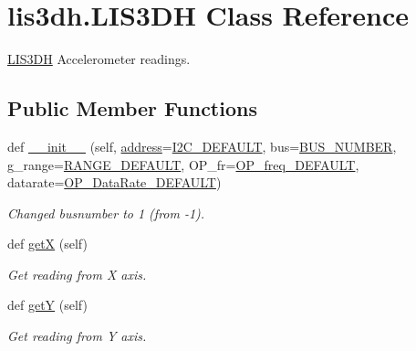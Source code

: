 \hypertarget{classlis3dh_1_1_l_i_s3_d_h}{}\section{lis3dh.\+L\+I\+S3\+DH Class Reference}
\label{classlis3dh_1_1_l_i_s3_d_h}


\mbox{\hyperlink{classlis3dh_1_1_l_i_s3_d_h}{L\+I\+S3\+DH}} Accelerometer readings.  


\subsection*{Public Member Functions}
\begin{DoxyCompactItemize}
\item 
def \mbox{\hyperlink{classlis3dh_1_1_l_i_s3_d_h_a9097ea52b7af8361987dee7b6ab1d3f1}{\+\_\+\+\_\+init\+\_\+\+\_\+}} (self, \mbox{\hyperlink{classlis3dh_1_1_l_i_s3_d_h_a0cd329009ec1fbf55f4789f59181cf04}{address}}=\mbox{\hyperlink{classlis3dh_1_1_l_i_s3_d_h_af6b66a20ed2112e95c14ce7b58697d9f}{I2\+C\+\_\+\+D\+E\+F\+A\+U\+LT}}, bus=\mbox{\hyperlink{classlis3dh_1_1_l_i_s3_d_h_a6dd4e8c65978e98d0f3765ff58552fc8}{B\+U\+S\+\_\+\+N\+U\+M\+B\+ER}}, g\+\_\+range=\mbox{\hyperlink{classlis3dh_1_1_l_i_s3_d_h_a022306eeafee6751efac48439f7d1ef1}{R\+A\+N\+G\+E\+\_\+\+D\+E\+F\+A\+U\+LT}}, O\+P\+\_\+fr=\mbox{\hyperlink{classlis3dh_1_1_l_i_s3_d_h_ac3e1a74a98644f0d2c87f2d381b011e2}{O\+P\+\_\+freq\+\_\+\+D\+E\+F\+A\+U\+LT}}, datarate=\mbox{\hyperlink{classlis3dh_1_1_l_i_s3_d_h_a5a7e6620a64989808fcecbc055b29cb9}{O\+P\+\_\+\+Data\+Rate\+\_\+\+D\+E\+F\+A\+U\+LT}})
\begin{DoxyCompactList}\small\item\em Changed busnumber to 1 (from -\/1). \end{DoxyCompactList}\item 
def \mbox{\hyperlink{classlis3dh_1_1_l_i_s3_d_h_a3b0455f4540add2bddabec0bdc4e0f65}{getX}} (self)
\begin{DoxyCompactList}\small\item\em Get reading from X axis. \end{DoxyCompactList}\item 
def \mbox{\hyperlink{classlis3dh_1_1_l_i_s3_d_h_a0939f6296902553b2cc3cd75e5adec99}{getY}} (self)
\begin{DoxyCompactList}\small\item\em Get reading from Y axis. \end{DoxyCompactList}\item 

\end{DoxyCompactItemize}
